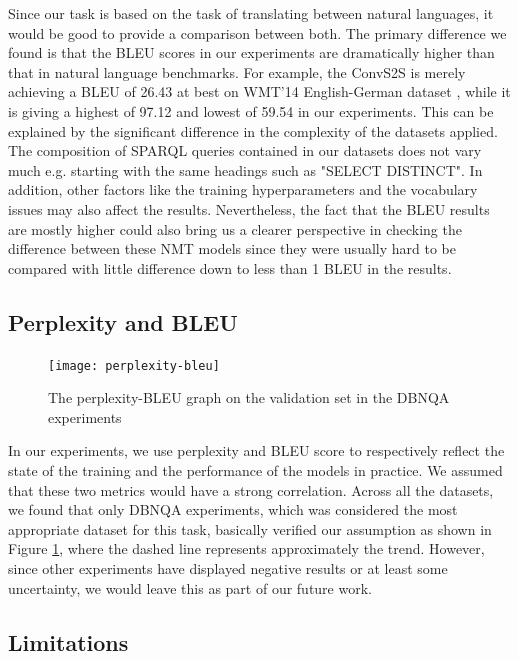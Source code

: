 Since our task is based on the task of translating between natural languages, it would be good to provide a comparison between both. The primary difference we found is that the BLEU scores in our experiments are dramatically higher than that in natural language benchmarks. For example, the ConvS2S is merely achieving a BLEU of 26.43 at best on WMT'14 English-German dataset \cite{gehring2017convs2s}, while it is giving a highest of 97.12 and lowest of 59.54 in our experiments. This can be explained by the significant difference in the complexity of the datasets applied. The composition of SPARQL queries contained in our datasets does not vary much e.g. starting with the same headings such as "SELECT DISTINCT". In addition, other factors like the training hyperparameters and the vocabulary issues may also affect the results. Nevertheless, the fact that the BLEU results are mostly higher could also bring us a clearer perspective in checking the difference between these NMT models since they were usually hard to be compared with little difference down to less than 1 BLEU in the results.

\subsection{Perplexity and BLEU}

\begin{figure}[H]
\texttt{[image: perplexity-bleu]}
\centering
\caption{The perplexity-BLEU graph on the validation set in the DBNQA experiments}
\label{fig:ppl-bleu}
\end{figure}

In our experiments, we use perplexity and BLEU score to respectively reflect the state of the training and the performance of the models in practice. We assumed that these two metrics would have a strong correlation. Across all the datasets, we found that only DBNQA experiments, which was considered the most appropriate dataset for this task, basically verified our assumption as shown in Figure \ref{fig:ppl-bleu}, where the dashed line represents approximately the trend. However, since other experiments have displayed negative results or at least some uncertainty, we would leave this as part of our future work. 

\subsection{Limitations} \label{subsection:limitation}

